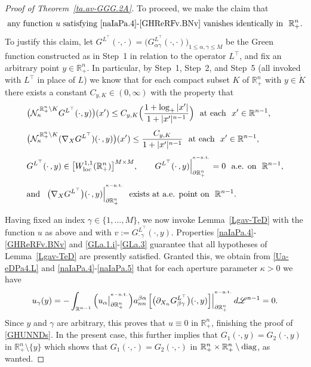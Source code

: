\documentclass[11pt,reqno]{amsart}
\numberwithin{equation}{section}
\theoremstyle{remark}
\begin{document}
\begin{proof}[Proof of Theorem~\ref{ta.av-GGG.2A}]
To proceed, we make the claim that 
%
\begin{equation}\label{GHUNNDs}
\text{any function $u$ satisfying \eqref{naIaPa.4}-\eqref{GHReRFv.BNv} vanishes
identically in }\,\,{\mathbb{R}}^n_{+}.
\end{equation}
%
To justify this claim, let 
$G^{L^\top}(\cdot,\cdot)=\big(G^{L^\top}_{\alpha\gamma}(\cdot,\cdot)\big)_{1\leq\alpha,\gamma\leq M}$ 
be the Green function constructed as in Step~1 in relation to the operator $L^\top$, 
and fix an arbitrary point $y\in{\mathbb{R}}^n_{+}$. In particular, by Step~1,
Step~2, and Step~5 (all invoked with $L^\top$ in place of $L$) we know that 
for each compact subset $K$ of ${\mathbb{R}}^n_{+}$ with $y\in\mathring{K}$
there exists a constant $C_{y,K}\in(0,\infty)$ with the property that 
%
\begin{align}\label{GLa.1.i}
&\big(\mathcal{N}^{\,\mathbb{R}^{n}_{+}\setminus K}_\kappa G^{L^\top}(\cdot,y)\big)(x')\leq
C_{y,K}\Big(\frac{1+\log_{+}|x'|}{1+|x'|^{n-1}}\Big)\,\,\text{ at each }\,\,x'\in{\mathbb{R}}^{n-1},
\\[4pt]
&\big({\mathcal{N}}_\kappa^{\,\mathbb{R}^{n}_{+}\setminus K}(\nabla_X G^{L^\top})(\cdot\,,y)\big)(x')
\leq\frac{C_{y,K}}{1+|x'|^{n-1}}\,\,\text{ at each }\,\,x'\in{\mathbb{R}}^{n-1},
\label{GLa.1.ii}
\\[4pt]
& G^{L^\top}(\cdot\,,y)\in\big[W^{1,1}_{\rm loc}({\mathbb{R}}^n_{+})\big]^{M\times M},\qquad
G^{L^\top}(\cdot\,,y)\Big|_{\partial\mathbb{R}^{n}_{+}}^{{}^{\kappa-{\rm n.t.}}}=0
\,\,\text{ a.e. on }\,\,{\mathbb{R}}^{n-1},
\label{GLa.2}
\\[4pt]
&\text{and }\,\,\,\big(\nabla_X G^{L^\top}\big)(\cdot\,,y)
\Big|_{\partial\mathbb{R}^{n}_{+}}^{{}^{\kappa-{\rm n.t.}}}
\,\,\text{ exists at a.e. point on }\,\,{\mathbb{R}}^{n-1}.
\label{GLa.3}
\end{align}

Having fixed an index $\gamma\in\{1,\dots,M\}$, we now invoke Lemma~\ref{Lgav-TeD} 
with the function $u$ as above and with $v:=G^{L^\top}_{\cdot\,\gamma}(\cdot,y)$. 
Properties \eqref{naIaPa.4}-\eqref{GHReRFv.BNv} and \eqref{GLa.1.i}-\eqref{GLa.3} 
guarantee that all hypotheses of Lemma~\ref{Lgav-TeD} are presently satisfied. Granted this, we obtain
from \eqref{Ua-eDPa4.L} and \eqref{naIaPa.4}-\eqref{naIaPa.5} that for each aperture parameter $\kappa>0$ we have
%
\begin{equation}\label{Ua-eDPaVVV}
u_\gamma(y)=-\int_{\mathbb{R}^{n-1}}
\Big(u_\alpha\big|_{\partial\mathbb{R}^{n}_{+}}^{{}^{\kappa-{\rm n.t.}}}\Big)a^{\beta\alpha}_{nn}\,
\Big[\big(\partial_{X_n} G^{L^\top}_{\beta\gamma}\big)(\cdot,y)
\Big]\Big|_{\partial\mathbb{R}^{n}_{+}}^{{}^{\kappa-{\rm n.t.}}}\,d{\mathscr{L}}^{n-1}=0.
\end{equation}
%
Since $y$ and $\gamma$ are arbitrary, this proves that $u\equiv 0$ 
in ${\mathbb{R}}^n_{+}$, finishing the proof of \eqref{GHUNNDs}. In the 
present case, this further implies that $G_1(\cdot,y)=G_2(\cdot,y)$ 
in ${\mathbb{R}}^n_{+}\setminus\{y\}$ which shows 
that $G_1(\cdot,\cdot)=G_2(\cdot,\cdot)$ in 
${\mathbb{R}}^n_{+}\times{\mathbb{R}}^n_{+}\setminus{\rm diag}$, as wanted.


\end{proof}
\end{document}
